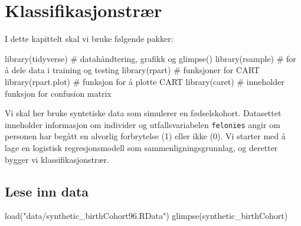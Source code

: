 \documentclass[
  letterpaper,
  DIV=11,
  numbers=noendperiod]{scrreprt}
\newenvironment{Shaded}{\begin{snugshade}}{\end{snugshade}}
\newcommand{\CommentTok}[1]{\textcolor[rgb]{0.37,0.37,0.37}{#1}}
\newcommand{\FunctionTok}[1]{\textcolor[rgb]{0.28,0.35,0.67}{#1}}
\newcommand{\NormalTok}[1]{\textcolor[rgb]{0.00,0.23,0.31}{#1}}
\newcommand{\StringTok}[1]{\textcolor[rgb]{0.13,0.47,0.30}{#1}}
\begin{document}

\chapter{Klassifikasjonstrær}\label{klassifikasjonstruxe6r}

I dette kapittelt skal vi bruke følgende pakker:

\begin{Shaded}
\begin{Highlighting}[]
\FunctionTok{library}\NormalTok{(tidyverse)   }\CommentTok{\# datahåndtering, grafikk og glimpse()}
\FunctionTok{library}\NormalTok{(rsample)     }\CommentTok{\# for å dele data i training og testing}
\FunctionTok{library}\NormalTok{(rpart)       }\CommentTok{\# funksjoner for CART}
\FunctionTok{library}\NormalTok{(rpart.plot)  }\CommentTok{\# funksjon for å plotte CART}
\FunctionTok{library}\NormalTok{(caret)       }\CommentTok{\# inneholder funksjon for confusion matrix}
\end{Highlighting}
\end{Shaded}

Vi skal her bruke syntetiske data som simulerer en fødselskohort.
Datasettet inneholder informasjon om individer og utfallsvariabelen
\texttt{felonies} angir om personen har begått en alvorlig forbrytelse
(1) eller ikke (0). Vi starter med å lage en logistisk regresjonsmodell
som sammenligningsgrunnlag, og deretter bygger vi klassifikasjonstrær.

\section{Lese inn data}\label{lese-inn-data-1}

\begin{Shaded}
\begin{Highlighting}[]
\FunctionTok{load}\NormalTok{(}\StringTok{"data/synthetic\_birthCohort96.RData"}\NormalTok{)}
\FunctionTok{glimpse}\NormalTok{(synthetic\_birthCohort)}
\end{Highlighting}
\end{Shaded}
\end{document}
